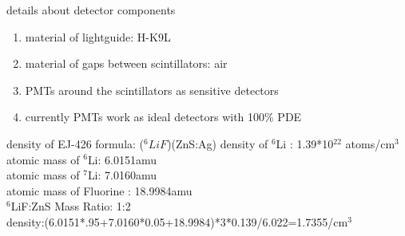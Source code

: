 \documentclass[11pt,compress,xcolor=x11names,UTF8]{beamer}
\begin{document}
\begin{frame}{ details about detector components}
	\begin{enumerate}
		\item material of lightguide:  H-K9L
		\item  material of gaps between scintillators: air
		\item  PMTs around the scintillators as sensitive detectors
		\item currently PMTs work as ideal detectors with 100\% PDE
	\end{enumerate}
\end{frame}
\begin{frame}{density of EJ-426}
	formula:	($^6LiF$)(ZnS:Ag) \qquad density of $^6$Li : 1.39*10$^{22}$ atoms/cm$^3$\\
atomic mass of $^6$Li: 6.0151amu\\
atomic mass of $^7$Li: 7.0160amu \\
atomic mass of Fluorine	: 18.9984amu \\
$^6$LiF:ZnS Mass Ratio: 1:2 \\
 density:(6.0151*.95+7.0160*0.05+18.9984)*3*0.139/6.022=1.7355/cm$^3$

\end{frame}
\end{document}
